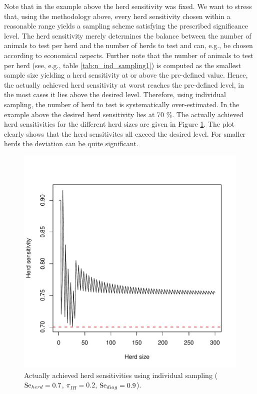 \documentclass[nojss]{jss}
\begin{document}
Note that in the example above the herd sensitivity was fixed. We want to stress that, using the methodology above, every herd sensitivity chosen within a reasonable range yields a sampling scheme satisfying the prescribed significance level. The herd sensitivity merely determines the balance between the number of animals to test per herd and the number of herds to test and can, e.g., be chosen according to economical aspects. Further note that the number of animals to test per herd (see, e.g., table \ref{tab:n_ind_sampling1}) is computed as the smallest sample size yielding a herd sensitivity at or above the pre-defined value. Hence, the actually achieved herd sensitivity at worst reaches the pre-defined level, in the most cases it lies above the desired level. Therefore, using individual sampling, the number of herd to test is systematically over-estimated. In the example above the desired herd sensitivity lies at 70 \%. The actually achieved herd sensitivities for the different herd sizes are given in Figure \ref{fig:Herd_sens_ind}. The plot clearly shows that the herd sensitivites all exceed the desired level. For smaller herds the deviation can be quite significant.


\begin{figure}[h!]
\centering
\includegraphics{FFD-intro-003}
\caption{Actually achieved herd sensitivities using individual sampling ($\mbox{Se}_{herd} = 0.7$, $\pi_{IH} = 0.2$, $\mbox{Se}_{diag} = 0.9$).}
\label{fig:Herd_sens_ind}
\end{figure}
\end{document}
